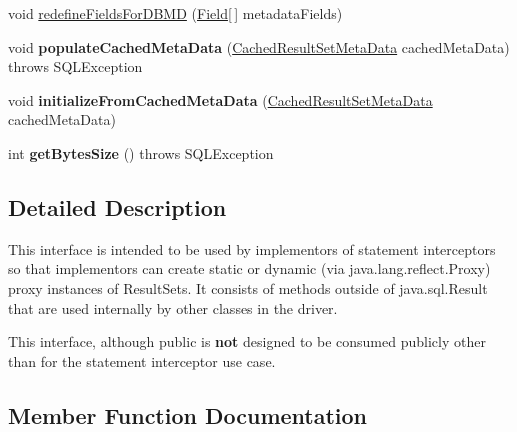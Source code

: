 \begin{DoxyCompactItemize}
\item 
void \mbox{\hyperlink{interfacecom_1_1mysql_1_1jdbc_1_1_result_set_internal_methods_a1d2bda162ae25d5209f62788938d2737}{redefine\+Fields\+For\+D\+B\+MD}} (\mbox{\hyperlink{classcom_1_1mysql_1_1jdbc_1_1_field}{Field}}\mbox{[}$\,$\mbox{]} metadata\+Fields)
\item 
\mbox{\label{interfacecom_1_1mysql_1_1jdbc_1_1_result_set_internal_methods_ad1e4bfb342905b43fe226b0835786036}} 
void {\bfseries populate\+Cached\+Meta\+Data} (\mbox{\hyperlink{classcom_1_1mysql_1_1jdbc_1_1_cached_result_set_meta_data}{Cached\+Result\+Set\+Meta\+Data}} cached\+Meta\+Data)  throws S\+Q\+L\+Exception
\item 
\mbox{\label{interfacecom_1_1mysql_1_1jdbc_1_1_result_set_internal_methods_afd8e74a794bf93788a0f06e011850b48}} 
void {\bfseries initialize\+From\+Cached\+Meta\+Data} (\mbox{\hyperlink{classcom_1_1mysql_1_1jdbc_1_1_cached_result_set_meta_data}{Cached\+Result\+Set\+Meta\+Data}} cached\+Meta\+Data)
\item 
\mbox{\label{interfacecom_1_1mysql_1_1jdbc_1_1_result_set_internal_methods_add1b4ac5369c98fefb7a23c0c91b8ca0}} 
int {\bfseries get\+Bytes\+Size} ()  throws S\+Q\+L\+Exception
\end{DoxyCompactItemize}


\subsection{Detailed Description}
This interface is intended to be used by implementors of statement interceptors so that implementors can create static or dynamic (via java.\+lang.\+reflect.\+Proxy) proxy instances of Result\+Sets. It consists of methods outside of java.\+sql.\+Result that are used internally by other classes in the driver.

This interface, although public is {\bfseries not} designed to be consumed publicly other than for the statement interceptor use case. 

\subsection{Member Function Documentation}
\mbox{\label{interfacecom_1_1mysql_1_1jdbc_1_1_result_set_internal_methods_a757042b555f10a48b4955346e32de2df}} 
